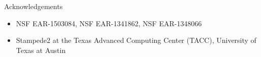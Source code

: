 \documentclass[13pt,aspectratio=169]{beamer}
\begin{document}


\begin{frame}{Acknowledgements}
	\begin{itemize}
		\item NSF EAR-1503084, NSF EAR-1341862, NSF EAR-1348066
		\item Stampede2 at the Texas Advanced Computing Center (TACC), University of Texas at Austin
	\end{itemize}
\end{frame}
\end{document}
